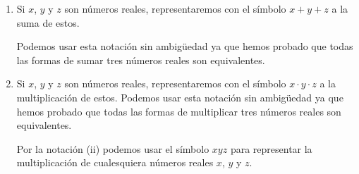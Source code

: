 \documentclass[11pt]{article}
\begin{document}

\pagebreak

\begin{enumerate}[label=\roman*)]
\item Si $x$, $y$ y $z$ son números reales, representaremos con el símbolo $x+y+z$ a la suma de estos.

Podemos usar esta notación sin ambigüedad ya que hemos probado que todas las formas de sumar tres números reales son equivalentes.
%
%

\item Si $x$, $y$ y $z$ son números reales, representaremos con el símbolo $x\cdot y\cdot z$ a la multiplicación de estos.
Podemos usar esta notación sin ambigüedad ya que hemos probado que todas las formas de multiplicar tres números reales son equivalentes.

Por la notación (ii) podemos usar el símbolo $xyz$ para representar la multiplicación de cualesquiera números reales $x$, $y$ y $z$.


\end{enumerate}
\end{document}
